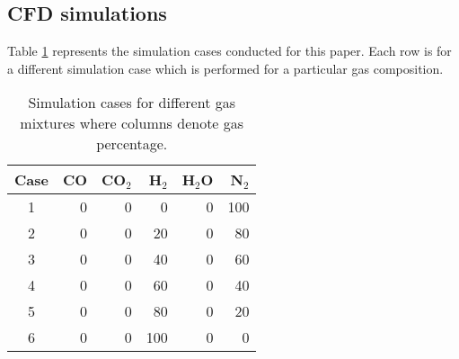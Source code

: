 \subsection{CFD simulations}

Table \ref{tab:cases} represents the simulation cases conducted for this paper. Each row is for a different simulation case which is performed for a particular gas composition.

\begin{table}[H]
    \centering
    \caption{Simulation cases for different gas mixtures where columns denote gas percentage.}
    \begin{tabular}{crrrrr}
        \hline
        Case    & CO    & CO$_2$    & H$_2$     & H$_2$O    & N$_2$     \\
        \hline
        1       & 0     & 0         & 0         & 0         & 100       \\
        2       & 0     & 0         & 20        & 0         & 80        \\
        3       & 0     & 0         & 40        & 0         & 60        \\
        4       & 0     & 0         & 60        & 0         & 40        \\
        5       & 0     & 0         & 80        & 0         & 20        \\
        6       & 0     & 0         & 100       & 0         & 0         \\
        \hline
    \end{tabular}
    \label{tab:cases}
\end{table}
